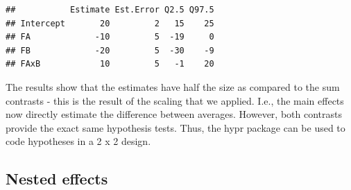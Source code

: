 \documentclass[12pt,]{krantz}
\newenvironment{Shaded}{\begin{snugshade}}{\end{snugshade}}
\newcommand{\KeywordTok}[1]{\textcolor[rgb]{0.13,0.29,0.53}{\textbf{#1}}}
\newcommand{\DataTypeTok}[1]{\textcolor[rgb]{0.13,0.29,0.53}{#1}}
\newcommand{\DecValTok}[1]{\textcolor[rgb]{0.00,0.00,0.81}{#1}}
\newcommand{\StringTok}[1]{\textcolor[rgb]{0.31,0.60,0.02}{#1}}
\newcommand{\OperatorTok}[1]{\textcolor[rgb]{0.81,0.36,0.00}{\textbf{#1}}}
\newcommand{\NormalTok}[1]{#1}
\theoremstyle{definition}
\theoremstyle{definition}
\theoremstyle{definition}
\theoremstyle{remark}
\begin{document}
\begin{Shaded}
\end{Shaded}

\begin{verbatim}
##           Estimate Est.Error Q2.5 Q97.5
## Intercept       20         2   15    25
## FA             -10         5  -19     0
## FB             -20         5  -30    -9
## FAxB            10         5   -1    20
\end{verbatim}

The results show that the estimates have half the size as compared to
the sum contrasts - this is the result of the scaling that we applied.
I.e., the main effects now directly estimate the difference between
averages. However, both contrasts provide the exact same hypothesis
tests. Thus, the hypr package can be used to code hypotheses in a 2 x 2
design.

\subsection{Nested effects}\label{nestedEffects}
\end{document}
